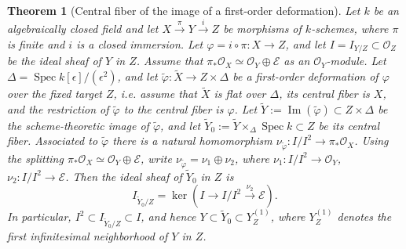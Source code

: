 \documentclass[11pt,twoside]{amsart}
\theoremstyle{plain}
\numberwithin{equation}{section}
\newtheorem{theorem}{Theorem}[section]
\theoremstyle{definition}
\begin{document}
\begin{theorem}[Central fiber of the image of a first-order deformation]
\label{thm:central-fiber-image-singular-source}
Let \(k\) be an algebraically closed field and let
\(X \xrightarrow{\pi} Y \xrightarrow{i} Z\)
be morphisms of \(k\)-schemes, where \(\pi\) is finite and \(i\) is a closed immersion. Let \(\varphi=i\circ \pi:X\to Z\), and let \(I=I_{Y/Z}\subset \mathcal O_Z\) be the ideal sheaf of \(Y\) in \(Z\). Assume that
\(\pi_*\mathcal O_X\simeq \mathcal O_Y\oplus \mathcal E\) as an \(\mathcal O_Y\)-module. Let \(\Delta=\operatorname{Spec} k[\epsilon]/(\epsilon^2)\), and let
\(\widetilde\varphi:\widetilde X\to Z\times \Delta\)
be a first-order deformation of \(\varphi\) over the fixed target \(Z\), i.e. assume that \(\widetilde X\) is flat over \(\Delta\), its central fiber is \(X\), and the restriction of \(\widetilde\varphi\) to the central fiber is \(\varphi\).
Let \(\widetilde Y:=\operatorname{Im}(\widetilde\varphi)\subset Z\times\Delta\)
be the scheme-theoretic image of \(\widetilde\varphi\), and let
\(\widetilde Y_0:=\widetilde Y\times_{\Delta}\operatorname{Spec}k\subset Z\)
be its central fiber. Associated to \(\widetilde\varphi\) there is a natural homomorphism \(\nu_{\widetilde\varphi}: I/I^2\to \pi_*\mathcal O_X\).
Using the splitting \(\pi_*\mathcal O_X\simeq \mathcal O_Y\oplus \mathcal E\), write
\(\nu_{\widetilde\varphi}=\nu_1\oplus \nu_2\), where \(\nu_1:I/I^2\to \mathcal O_Y\), \(\nu_2:I/I^2\to \mathcal E\). Then the ideal sheaf of \(\widetilde Y_0\) in \(Z\) is
\[
    I_{\widetilde Y_0/Z}
    =
    \ker\left(
        I
        \longrightarrow
        I/I^2
        \xrightarrow{\nu_2}
        \mathcal E
    \right).
\]
In particular, \(I^2\subset I_{\widetilde Y_0/Z}\subset I\), and hence
\(Y\subset \widetilde Y_0\subset Y^{(1)}_Z\), where \(Y^{(1)}_Z\) denotes the first
infinitesimal neighborhood of \(Y\) in \(Z\).
\end{theorem}
\end{document}
